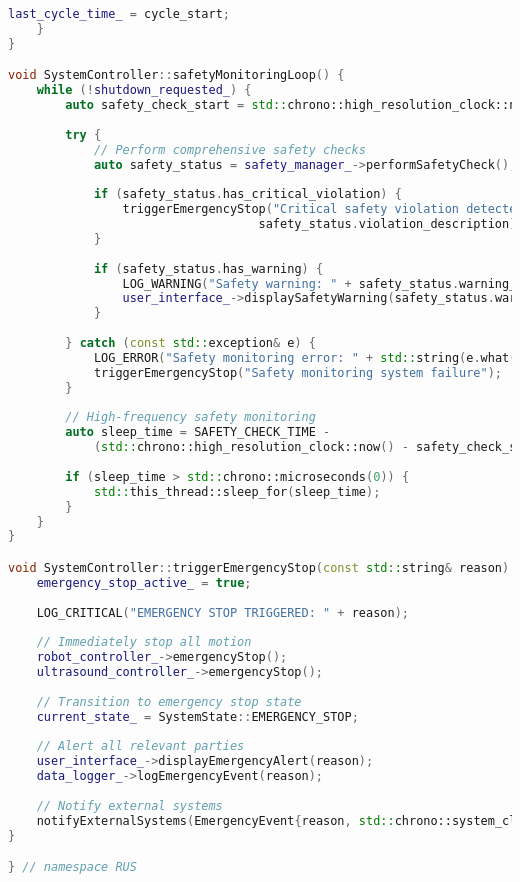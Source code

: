 \begin{lstlisting}[language=C++, caption={Main System Controller Implementation}, label={lst:app-main-controller}]
        last_cycle_time_ = cycle_start;
    }
}

void SystemController::safetyMonitoringLoop() {
    while (!shutdown_requested_) {
        auto safety_check_start = std::chrono::high_resolution_clock::now();
        
        try {
            // Perform comprehensive safety checks
            auto safety_status = safety_manager_->performSafetyCheck();
            
            if (safety_status.has_critical_violation) {
                triggerEmergencyStop("Critical safety violation detected: " + 
                                   safety_status.violation_description);
            }
            
            if (safety_status.has_warning) {
                LOG_WARNING("Safety warning: " + safety_status.warning_description);
                user_interface_->displaySafetyWarning(safety_status.warning_description);
            }
            
        } catch (const std::exception& e) {
            LOG_ERROR("Safety monitoring error: " + std::string(e.what()));
            triggerEmergencyStop("Safety monitoring system failure");
        }
        
        // High-frequency safety monitoring
        auto sleep_time = SAFETY_CHECK_TIME - 
            (std::chrono::high_resolution_clock::now() - safety_check_start);
        
        if (sleep_time > std::chrono::microseconds(0)) {
            std::this_thread::sleep_for(sleep_time);
        }
    }
}

void SystemController::triggerEmergencyStop(const std::string& reason) {
    emergency_stop_active_ = true;
    
    LOG_CRITICAL("EMERGENCY STOP TRIGGERED: " + reason);
    
    // Immediately stop all motion
    robot_controller_->emergencyStop();
    ultrasound_controller_->emergencyStop();
    
    // Transition to emergency stop state
    current_state_ = SystemState::EMERGENCY_STOP;
    
    // Alert all relevant parties
    user_interface_->displayEmergencyAlert(reason);
    data_logger_->logEmergencyEvent(reason);
    
    // Notify external systems
    notifyExternalSystems(EmergencyEvent{reason, std::chrono::system_clock::now()});
}

} // namespace RUS
\end{lstlisting}

